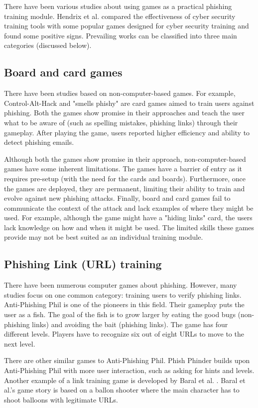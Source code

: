 There have been various studies about using games as a practical phishing training module. Hendrix et al. \cite{hendrix_al_sherbaz_bloom_2016} compared the effectiveness of cyber security training tools with some popular games designed for cyber security training and found some positive signs. Prevailing works can be classified into three main categories (discussed below).

\subsection{Board and card games}
There have been studies based on non-computer-based games. For example, Control-Alt-Hack \cite{control_alt_hack} and "smells phishy" \cite{smels_phishy} are card games aimed to train users against phishing. Both the games show promise in their approaches and teach the user what to be aware of (such as spelling mistakes, phishing links) through their gameplay. After playing the game, users reported higher efficiency and ability to detect phishing emails.

Although both the games show promise in their approach, non-computer-based games have some inherent limitations. The games have a barrier of entry as it requires pre-setup (with the need for the cards and boards). Furthermore, once the games are deployed, they are permanent, limiting their ability to train and evolve against new phishing attacks. Finally, board and card games fail to communicate the context of the attack and lack examples of where they might be used. For example, although the game might have a "hiding links" card, the users lack knowledge on how and when it might be used. The limited skills these games provide may not be best suited as an individual training module.

\subsection{Phishing Link (URL) training}
There have been numerous computer games about phishing. However, many studies focus on one common category: training users to verify phishing links. Anti-Phishing Phil \cite{anti_phishing_phil} is one of the pioneers in this field. Their gameplay puts the user as a fish. The goal of the fish is to grow larger by eating the good bugs (non-phishing links) and avoiding the bait (phishing links). The game has four different levels. Players have to recognize six out of eight URLs to move to the next level.

There are other similar games to Anti-Phishing Phil. Phish Phinder \cite{phish_phinder} builds upon Anti-Phishing Phil with more user interaction, such as asking for hints and levels. Another example of a link training game is developed by Baral et al. \cite{gamified_approach}. Baral et al.'s game story is based on a ballon shooter where the main character has to shoot balloons with legitimate URLs.

